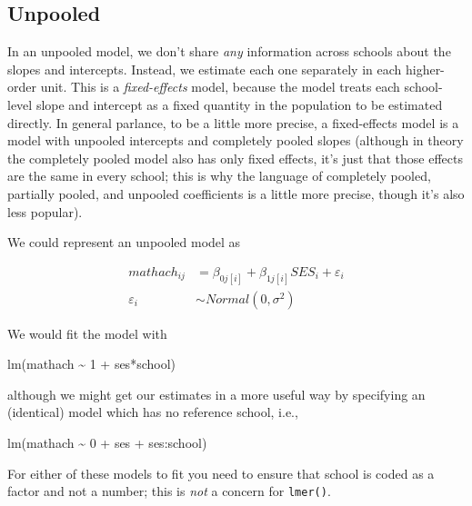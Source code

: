 \documentclass[
  letterpaper,
  DIV=11,
  numbers=noendperiod]{scrreprt}
\newenvironment{Shaded}{}{}
\newcommand{\DecValTok}[1]{\textcolor[rgb]{0.25,0.63,0.44}{#1}}
\newcommand{\FunctionTok}[1]{\textcolor[rgb]{0.02,0.16,0.49}{#1}}
\newcommand{\NormalTok}[1]{#1}
\newcommand{\SpecialCharTok}[1]{\textcolor[rgb]{0.25,0.44,0.63}{#1}}
\begin{document}
\subsection{Unpooled}\label{unpooled}

In an unpooled model, we don't share \emph{any} information across
schools about the slopes and intercepts. Instead, we estimate each one
separately in each higher-order unit. This is a \emph{fixed-effects}
model, because the model treats each school-level slope and intercept as
a fixed quantity in the population to be estimated directly. In general
parlance, to be a little more precise, a fixed-effects model is a model
with unpooled intercepts and completely pooled slopes (although in
theory the completely pooled model also has only fixed effects, it's
just that those effects are the same in every school; this is why the
language of completely pooled, partially pooled, and unpooled
coefficients is a little more precise, though it's also less popular).

We could represent an unpooled model as

\[\begin{aligned}
    mathach_{ij} &= \beta_{0j[i]} + \beta_{1j[i]}SES_i + \varepsilon_i \\
    \varepsilon_i &\sim Normal(0, \sigma^2)
\end{aligned}\]

We would fit the model with

\begin{Shaded}
\begin{Highlighting}[]
\FunctionTok{lm}\NormalTok{(mathach }\SpecialCharTok{\textasciitilde{}} \DecValTok{1} \SpecialCharTok{+}\NormalTok{ ses}\SpecialCharTok{*}\NormalTok{school)}
\end{Highlighting}
\end{Shaded}

although we might get our estimates in a more useful way by specifying
an (identical) model which has no reference school, i.e.,

\begin{Shaded}
\begin{Highlighting}[]
\FunctionTok{lm}\NormalTok{(mathach }\SpecialCharTok{\textasciitilde{}} \DecValTok{0} \SpecialCharTok{+}\NormalTok{ ses }\SpecialCharTok{+}\NormalTok{ ses}\SpecialCharTok{:}\NormalTok{school)}
\end{Highlighting}
\end{Shaded}

For either of these models to fit you need to ensure that school is
coded as a factor and not a number; this is \emph{not} a concern for
\texttt{lmer()}.
\end{document}
